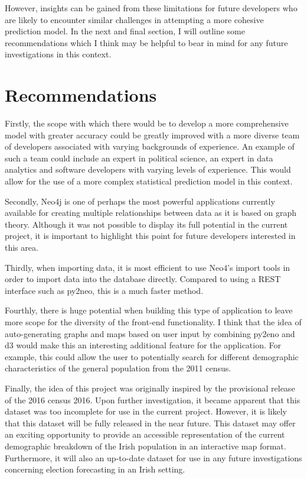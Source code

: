 However, insights can be gained from these limitations for future developers who are likely to encounter similar challenges in attempting a more cohesive prediction model. In the next and final section, I will outline some recommendations which I think may be helpful to bear in mind for any future investigations in this context.

\section{Recommendations}
Firstly, the scope with which there would be to develop a more comprehensive model with greater accuracy could be greatly improved with a more diverse team of developers associated with varying backgrounds of experience. An example of such a team could include an expert in political science, an expert in data analytics and software developers with varying levels of experience. This would allow for the use of a more complex statistical prediction model in this context.

Secondly, Neo4j is one of perhaps the most powerful applications currently available for creating multiple relationships between data as it is based on graph theory. Although it was not possible to display its full potential in the current project, it is important to highlight this point for future developers interested in this area. 

Thirdly, when importing data, it is most efficient to use Neo4’s import tools in order to import data into the database directly. Compared to using a REST interface such as py2neo, this is a much faster method.

Fourthly, there is huge potential when building this type of application to leave more scope for the diversity of the front-end functionality. I think that the idea of auto-generating graphs and maps based on user input by combining py2eno and d3 would make this an interesting additional feature for the application. For example, this could allow the user to potentially search for different demographic characteristics of the general population from the 2011 census.

Finally, the idea of this project was originally inspired by the provisional release of the 2016 census 2016. Upon further investigation, it became apparent that this dataset was too incomplete for use in the current project. However, it is likely that this dataset will be fully released in the near future. This dataset may offer an exciting opportunity to provide an accessible representation of the current demographic breakdown of the Irish population in an interactive map format. Furthermore, it will also an up-to-date dataset for use in any future investigations concerning election forecasting in an Irish setting. 
